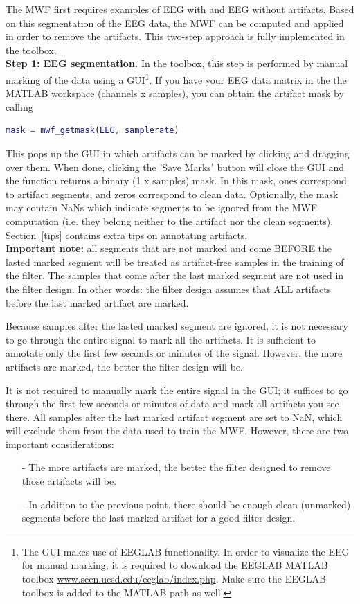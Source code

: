 \documentclass[11pt]{article}
\begin{document}
The MWF first requires examples of EEG with and EEG without artifacts. Based on this segmentation of the EEG data, the MWF can be computed and applied in order to remove the artifacts. This two-step approach is fully implemented in the toolbox.
\\

\textbf{Step 1: EEG segmentation.} In the toolbox, this step is performed by manual marking of the data using a GUI\footnote{The GUI makes use of EEGLAB functionality. In order to visualize the EEG for manual marking, it is required to download the EEGLAB MATLAB toolbox \url{www.sccn.ucsd.edu/eeglab/index.php}. Make sure the EEGLAB toolbox is added to the MATLAB path as well.}. If you have your EEG data matrix in the the MATLAB workspace (channels x samples), you can obtain the artifact mask by calling

\begin{lstlisting}[frame=single, language=matlab]
    mask = mwf_getmask(EEG, samplerate)
\end{lstlisting}

This pops up the GUI in which artifacts can be marked by clicking and dragging over them. When done, clicking the 'Save Marks' button will close the GUI and the function returns a binary (1 x samples) mask. In this mask, ones correspond to artifact segments, and zeros correspond to clean data. Optionally, the mask may contain NaNs which indicate segments to be ignored from the MWF computation (i.e. they belong neither to the artifact nor the clean segments). Section~\ref{tips} contains extra tips on annotating artifacts.
\\

\textbf{Important note:} all segments that are not marked and come BEFORE the lasted marked segment will be treated as artifact-free samples in the training of the filter. The samples that come after the last marked segment are not used in the filter design. In other words: the filter design assumes that ALL artifacts before the last marked artifact are marked.

Because samples after the lasted marked segment are ignored, it is not necessary to go through the entire signal to mark all the artifacts. It is sufficient to annotate only the first few seconds or minutes of the signal. However, the more artifacts are marked, the better the filter design will be.

It is not required to manually mark the entire signal in the GUI; it suffices to go through the first few seconds or minutes of data and mark all artifacts you see there. All samples after the last marked artifact segment are set to NaN, which will exclude them from the data used to train the MWF. However, there are two important considerations:
\begin{itemize}[noitemsep]
\item[-] The more artifacts are marked, the better the filter designed to remove those artifacts will be.
\item[-] In addition to the previous point, there should be enough clean (unmarked) segments before the last marked artifact for a good filter design.
\end{itemize}
\end{document}
